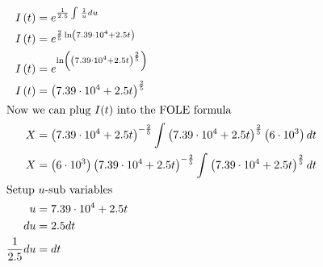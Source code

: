 \documentclass[12pt]{article}
\begin{document}
\begin{align}
  I\left(t\right)                                                                          & =e^{\frac{1}{2.5}\int_{ }^{ }\frac{1}{u}du}                                                                                                                               \\
  I\left(t\right)                                                                          & =e^{\frac{2}{5}\ln\left(7.39\cdot10^{4}+2.5t\right)}                                                                                                                      \\
  I\left(t\right)                                                                          & =e^{\ln\left(\left(7.39\cdot10^{4}+2.5t\right)^{\frac{2}{5}}\right)}                                                                                                      \\
  I\left(t\right)                                                                          & =\left(7.39\cdot10^{4}+2.5t\right)^{\frac{2}{5}}                                                                                                                          \\
  \intertext{Now we can plug $I(t)$ into the FOLE formula}
  X                                                                                        & =\left(7.39\cdot10^{4}+2.5t\right)^{-\frac{2}{5}}\int_{ }^{ }\left(7.39\cdot10^{4}+2.5t\right)^{\frac{2}{5}}\left(6\cdot10^{3}\right)dt                                   \\
  X                                                                                        & =\left(6\cdot10^{3}\right)\left(7.39\cdot10^{4}+2.5t\right)^{-\frac{2}{5}}\int_{ }^{ }\left(7.39\cdot10^{4}+2.5t\right)^{\frac{2}{5}}dt                                   \\
  \intertext{Setup $u$-sub variables}
  u                                                                                        & =7.39\cdot10^{4}+2.5t                                                                                                                                                     \\
  du                                                                                       & =2.5dt                                                                                                                                                                    \\
  \frac{1}{2.5}du                                                                          & =dt                                                                                                                                                                       \\

\end{align}
\end{document}

